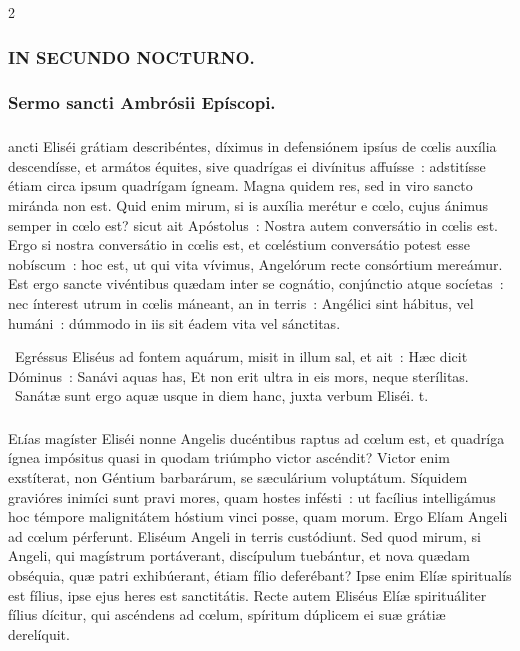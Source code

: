 \documentclass[9pt,twoside]{extarticle}
\begin{document}
\begin{multicols}{2}
{\subsubsection*{\center \textsc{IN SECUNDO NOCTURNO.}}
\subsubsection*{\center Sermo sancti Ambrósii Epíscopi.}
\subsubsection*{\center {}}
ancti Eliséi grátiam describéntes, díximus in defensiónem ipsíus de cœlis auxília descendísse, et armátos équites, sive quadrígas ei divínitus affuísse~: adstitísse étiam circa ipsum quadrígam ígneam. Magna quidem res, sed in viro sancto miránda non est. Quid enim mirum, si is auxília merétur e cœlo, cujus ánimus semper in cœlo est? sicut ait Apóstolus~: Nostra autem conversátio in cœlis est. Ergo si nostra conversátio in cœlis est, et cœléstium conversátio potest esse nobíscum~: hoc est, ut qui vita vívimus, Angelórum recte consórtium mereámur. Est ergo sancte vivéntibus quædam inter se cognátio, conjúnctio atque socíetas~: nec ínterest utrum in cœlis máneant, an in terris~: Angélici sint hábitus, vel humáni~: dúmmodo in iis sit éadem vita vel sánctitas.

\begin{tightlist}{}
\item {}~Egréssus Eliséus ad fontem aquárum, misit in illum sal, et ait~: Hæc dicit Dóminus~: Sanávi aquas has, \textred{*} Et non erit ultra in eis mors, neque sterílitas. ~Sanátæ sunt ergo aquæ usque in diem hanc, juxta verbum Eliséi. t.
\end{tightlist}

\subsubsection*{\center {}}
\lettrine{E}lías magíster Eliséi nonne Angelis ducéntibus raptus ad cœlum est, et quadríga ígnea impósitus quasi in quodam triúmpho victor ascéndit? Victor enim exstíterat, non Géntium barbarárum, se sæculárium voluptátum. Síquidem gravióres inimíci sunt pravi mores, quam hostes infésti~: ut facílius intelligámus hoc témpore malignitátem hóstium vinci posse, quam morum. Ergo Elíam Angeli ad cœlum pérferunt. Eliséum Angeli in terris custódiunt. Sed quod mirum, si Angeli, qui magístrum portáverant, discípulum tuebántur, et nova quædam obséquia, quæ patri exhibúerant, étiam fílio deferébant? Ipse enim Elíæ spiritualís est fílius, ipse ejus heres est sanctitátis. Recte autem Eliséus Elíæ spirituáliter fílius dícitur, qui ascéndens ad cœlum, spíritum dúplicem ei suæ grátiæ derelíquit.

}
\end{multicols}
\end{document}
